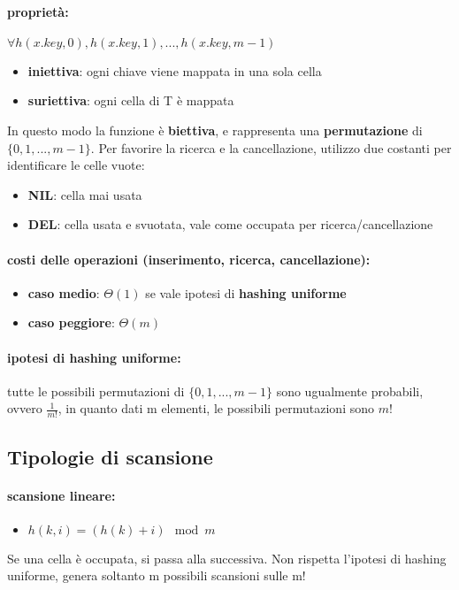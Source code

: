 \documentclass{article}
\begin{document}
\paragraph{proprietà:} $\forall h(x.key, 0), h(x.key, 1), ... , h(x.key,m-1)$
\begin{itemize}
    \item \textbf{iniettiva}: ogni chiave viene mappata in una sola cella
    \item \textbf{suriettiva}: ogni cella di T è mappata
\end{itemize}
In questo modo la funzione è \textbf{biettiva}, e rappresenta una \textbf{permutazione} di $\{0,1,...,m-1\}$.
Per favorire la ricerca e la cancellazione, utilizzo due costanti per identificare le celle vuote:
\begin{itemize}
    \item \textbf{NIL}: cella mai usata
    \item \textbf{DEL}: cella usata e svuotata, vale come occupata per ricerca/cancellazione
\end{itemize}

\paragraph{costi delle operazioni (inserimento, ricerca, cancellazione):}
\begin{itemize}
    \item \textbf{caso medio}: $\Theta(1)$ se vale ipotesi di \textbf{hashing uniforme}
    \item \textbf{caso peggiore}: $\Theta(m)$
\end{itemize}

\paragraph{ipotesi di hashing uniforme:} tutte le possibili permutazioni di $\{0,1,...,m-1\}$ sono ugualmente probabili, ovvero $\displaystyle \frac{1}{m!}$, in quanto dati m elementi, 
le possibili permutazioni sono $m!$

\subsection{Tipologie di scansione}

\paragraph{scansione lineare:}
\begin{itemize}
    \item $h(k,i) = (h(k) + i) \mod m$
\end{itemize}
Se una cella è occupata, si passa alla successiva. Non rispetta l'ipotesi di hashing uniforme, genera soltanto m possibili scansioni sulle m!
\end{document}
